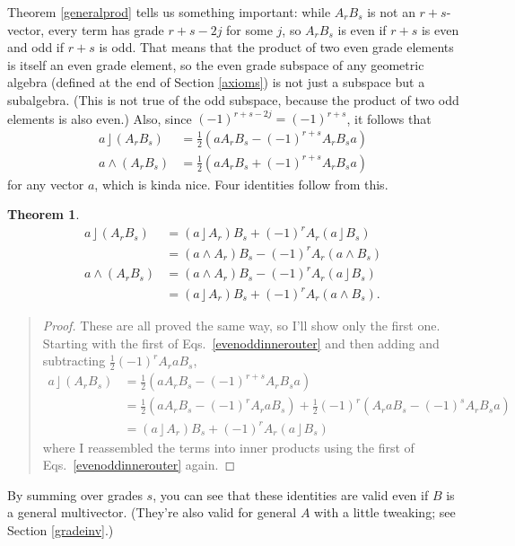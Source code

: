 \documentclass{utarticle}
\DeclareMathOperator{\lin}{\rfloor}
\DeclareMathOperator{\out}{\wedge}
\newcommand{\half}{\ensuremath{\frac{1}{2}}}
\newtheorem{thm}{Theorem}
\newcommand{\bp}{\begin{quotation} \begin{proof}}
\newcommand{\ep}{\end{proof} \end{quotation}}
\begin{document}
Theorem \ref{generalprod} tells us something important: while $A_r B_s$ is not an 
$r+s$-vector, every term has grade $r+s-2j$ for some
$j$, so $A_r B_s$ is even if $r+s$ is even and odd if $r+s$ is odd.
That means that the product of two even grade elements is itself an
even grade element, so the even grade subspace of any geometric
algebra (defined at the end of Section \ref{axioms}) is not just a
subspace but a subalgebra.  (This is not true of the odd subspace,
because the product of two odd elements is also even.)  Also, since 
$(-1)^{r+s-2j} = (-1)^{r+s}$, it follows that
\begin{align}
a \lin (A_r B_s) & = \half(a A_r B_s - (-1)^{r+s} A_r B_s a) \nonumber \\
a \out (A_r B_s) & = \half(a A_r B_s + (-1)^{r+s} A_r B_s a)
\label{evenoddinnerouter} 
\end{align}
for any vector $a$, which is kinda nice.  Four identities follow from this.
\begin{thm}
\begin{align}
a \lin (A_r B_s) & = (a \lin A_r) B_s + (-1)^r A_r (a \lin B_s) \nonumber \\
                   & = (a \out A_r) B_s - (-1)^r A_r (a \out B_s) \nonumber \\
a \out (A_r B_s) & = (a \out A_r) B_s - (-1)^r A_r (a \lin B_s) \nonumber \\
                   & = (a \lin A_r) B_s + (-1)^r A_r (a \out B_s).
\label{usefulids}
\end{align}
\end{thm}
\bp
These are all proved the same way, so I'll show only the first one.  Starting with
the first of Eqs.~\eqref{evenoddinnerouter} and then adding and subtracting
$\half (-1)^r A_r a B_s$,
\begin{align}
a \lin (A_r B_s) & = \half(a A_r B_s - (-1)^{r+s}A_r B_s a) \nonumber \\
 & = \half(a A_r B_s - (-1)^r A_r a B_s) + \half(-1)^r (A_r a B_s - 
     (-1)^s A_r B_s a) \nonumber \\
 & = (a \lin A_r) B_s + (-1)^r A_r (a \lin B_s)
\end{align}
where I reassembled the terms into inner products using the first of
Eqs.~\eqref{evenoddinnerouter} again.
\ep

By summing over grades $s$, you can see that these identities are valid even if 
$B$ is a general multivector.  (They're also valid for general $A$ with a little 
tweaking; see Section \ref{gradeinv}.)
\end{document}

